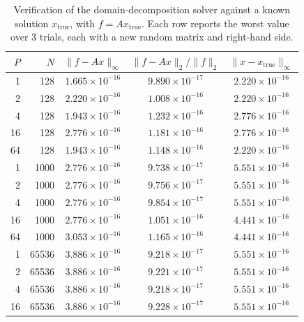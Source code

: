 \documentclass[11pt]{article}
\begin{document}
\begin{table}[htbp]
  \centering
  \caption{Verification of the domain-decomposition solver against a known solution $x_{\text{true}}$, with $f = A x_{\text{true}}$.
    Each row reports the worst value over 3 trials, each with a new random matrix and right-hand side.}
  \label{tab:verify}
  \begin{tabular}{rrccc}
    \toprule
    $P$ & $N$     & $\|f - Ax\|_\infty$   & $\|f - Ax\|_2 / \|f\|_2$ & $\|x - x_{\text{true}}\|_\infty$ \\
    \midrule
    1   & 128     & $1.665\times10^{-16}$ & $9.890\times10^{-17}$    & $2.220\times10^{-16}$            \\
    2   & 128     & $2.220\times10^{-16}$ & $1.008\times10^{-16}$    & $2.220\times10^{-16}$            \\
    4   & 128     & $1.943\times10^{-16}$ & $1.232\times10^{-16}$    & $2.776\times10^{-16}$            \\
    16  & 128     & $2.776\times10^{-16}$ & $1.181\times10^{-16}$    & $2.776\times10^{-16}$            \\
    64  & 128     & $1.943\times10^{-16}$ & $1.148\times10^{-16}$    & $2.220\times10^{-16}$            \\
    \midrule
    1   & 1000    & $2.776\times10^{-16}$ & $9.738\times10^{-17}$    & $5.551\times10^{-16}$            \\
    2   & 1000    & $2.776\times10^{-16}$ & $9.756\times10^{-17}$    & $5.551\times10^{-16}$            \\
    4   & 1000    & $2.776\times10^{-16}$ & $9.854\times10^{-17}$    & $5.551\times10^{-16}$            \\
    16  & 1000    & $2.776\times10^{-16}$ & $1.051\times10^{-16}$    & $4.441\times10^{-16}$            \\
    64  & 1000    & $3.053\times10^{-16}$ & $1.165\times10^{-16}$    & $4.441\times10^{-16}$            \\
    \midrule
    1   & 65536   & $3.886\times10^{-16}$ & $9.218\times10^{-17}$    & $5.551\times10^{-16}$            \\
    2   & 65536   & $3.886\times10^{-16}$ & $9.221\times10^{-17}$    & $5.551\times10^{-16}$            \\
    4   & 65536   & $3.886\times10^{-16}$ & $9.218\times10^{-17}$    & $5.551\times10^{-16}$            \\
    16  & 65536   & $3.886\times10^{-16}$ & $9.228\times10^{-17}$    & $5.551\times10^{-16}$            \\

\end{tabular}
\end{table}
\end{document}
